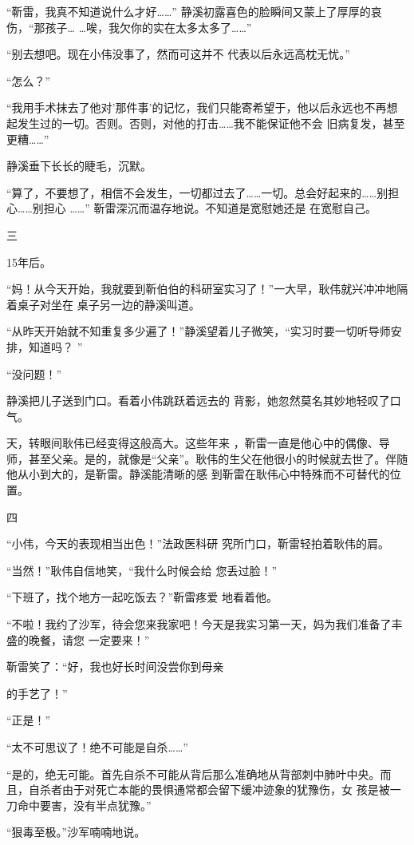 \documentclass{article}
\begin{document}
“靳雷，我真不知道说什么才好……” 静溪初露喜色的脸瞬间又蒙上了厚厚的哀伤，“那孩子…
…唉，我欠你的实在太多太多了……” 

“别去想吧。现在小伟没事了，然而可这并不
代表以后永远高枕无忧。” 


“怎么？” 

“我用手术抹去了他对'那件事'的记忆，我们只能寄希望于，他以后永远也不再想起发生过的一切。否则。否则，对他的打击……我不能保证他不会
旧病复发，甚至更糟……” 


静溪垂下长长的睫毛，沉默。 

“算了，不要想了，相信不会发生，一切都过去了……一切。总会好起来的……别担心……别担心
\newpage
……” 靳雷深沉而温存地说。不知道是宽慰她还是
在宽慰自己。 


三 


15年后。 

“妈！从今天开始，我就要到靳伯伯的科研室实习了！”一大早，耿伟就兴冲冲地隔着桌子对坐在
桌子另一边的静溪叫道。 

“从昨天开始就不知重复多少遍了！”静溪望着儿子微笑，“实习时要一切听导师安排，知道吗？
” 


“没问题！” 

静溪把儿子送到门口。看着小伟跳跃着远去的
背影，她忽然莫名其妙地轻叹了口气。 

天，转眼间耿伟已经变得这般高大。这些年来
\newpage
，靳雷一直是他心中的偶像、导师，甚至父亲。是的，就像是“父亲”。耿伟的生父在他很小的时候就去世了。伴随他从小到大的，是靳雷。静溪能清晰的感
到靳雷在耿伟心中特殊而不可替代的位置。 


四 

“小伟，今天的表现相当出色！”法政医科研
究所门口，靳雷轻拍着耿伟的肩。 

“当然！”耿伟自信地笑，“我什么时候会给
您丢过脸！” 

“下班了，找个地方一起吃饭去？”靳雷疼爱
地看着他。 

“不啦！我约了沙军，待会您来我家吧！今天是我实习第一天，妈为我们准备了丰盛的晚餐，请您
一定要来！” 

靳雷笑了：“好，我也好长时间没尝你到母亲
\newpage

的手艺了！” 


“正是！” 


“太不可思议了！绝不可能是自杀……” 

“是的，绝无可能。首先自杀不可能从背后那么准确地从背部刺中肺叶中央。而且，自杀者由于对死亡本能的畏惧通常都会留下缓冲迹象的犹豫伤，女
孩是被一刀命中要害，没有半点犹豫。” 


“狠毒至极。”沙军喃喃地说。 
\end{document}
